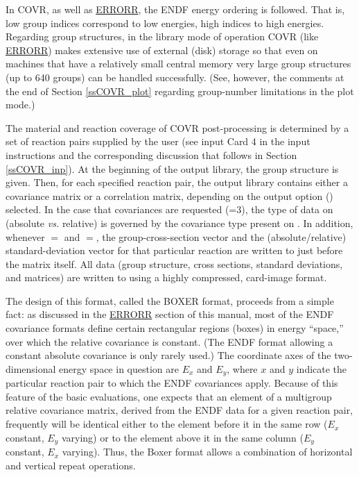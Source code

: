 In COVR, as well as
\hyperlink{sERRORRhy}{ERRORR}, the ENDF energy ordering is followed.  That
is, low group indices correspond to low energies, high indices to high
energies.  Regarding group structures, in the library mode of
operation COVR (like
\hyperlink{sERRORRhy}{ERRORR}) makes extensive use of external (disk)
storage so that even on machines that have a relatively small central
memory very large group structures (up to 640 groups) can be handled
successfully.  (See, however, the comments at the end of
Section \ref{ssCOVR_plot}
regarding group-number limitations in the plot mode.)

The material and reaction coverage of COVR post-processing is
determined by a set of reaction pairs 
supplied by the user (see input Card 4 in the input instructions
and the corresponding discussion that follows in Section \ref{ssCOVR_inp}).
At the beginning of the output library, the group structure is given.  Then,
for each specified reaction pair, the output library contains either a
covariance matrix or a correlation matrix, depending on the output
option () selected.  In the case that covariances are
requested (=3), the type of data on 
(absolute {\it vs.} relative) is governed by the covariance type present
on .   In addition, whenever $=$ and
$=$, the group-cross-section vector and the
(absolute/relative) standard-deviation vector for that particular
reaction are written to  just before the matrix itself.
All data (group structure, cross sections, standard deviations, and
matrices) are written to  using a highly compressed,
card-image format.

The design of this format, called the BOXER format,
proceeds from a simple fact: as discussed in the
\hyperlink{sERRORRhy}{ERRORR} section of this
manual, most of the ENDF covariance formats define certain rectangular
regions (boxes) in energy ``space,'' over which the relative covariance
is constant. (The ENDF format allowing a constant absolute
covariance is only rarely used.)  The coordinate axes of the
two-dimensional energy space in question are $E_{x}$ and $E_{y}$, where
$x$ and $y$ indicate the particular reaction pair to which the ENDF
covariances apply.  Because of this feature of the basic evaluations,
one expects that an element of a multigroup relative covariance matrix,
derived from the ENDF data for a given reaction pair, frequently will
be identical either to the element before it in the same row ($E_{x}$
constant, $E_{y}$ varying) or to the element above it in the same
column ($E_{y}$ constant, $E_{x}$ varying).  Thus, the Boxer format
allows a combination of horizontal and vertical repeat
operations.

